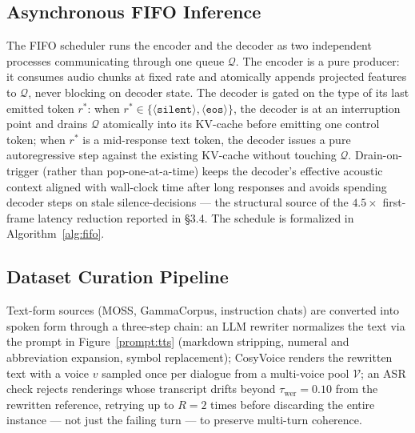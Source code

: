 \documentclass{llmxive}
\begin{document}
\subsection{Asynchronous FIFO Inference}
\label{appendix:fifo-inference}

The FIFO scheduler runs the encoder and the decoder as two independent
processes communicating through one queue $\mathcal{Q}$. The encoder is
a pure producer: it consumes audio chunks at fixed rate and atomically
appends projected features to $\mathcal{Q}$, never blocking on decoder
state. The decoder is gated on the type of its last emitted token $r^*$:
when $r^*\!\in\!\{\langle\texttt{silent}\rangle,
\langle\texttt{eos}\rangle\}$, the decoder is at an interruption point
and drains $\mathcal{Q}$ atomically into its KV-cache before emitting
one control token; when $r^*$ is a mid-response text token, the decoder
issues a pure autoregressive step against the existing KV-cache without
touching $\mathcal{Q}$. Drain-on-trigger (rather than pop-one-at-a-time)
keeps the decoder's effective acoustic context aligned with wall-clock
time after long responses and avoids spending decoder steps on stale
silence-decisions --- the structural source of the $4.5\times$
first-frame latency reduction reported in \S3.4. The schedule is
formalized in Algorithm~\ref{alg:fifo}.

\subsection{Dataset Curation Pipeline}
\label{appendix:curation}

Text-form sources (MOSS, GammaCorpus, instruction chats) are converted
into spoken form through a three-step chain: an LLM rewriter normalizes
the text via the prompt in Figure~\ref{prompt:tts} (markdown stripping,
numeral and abbreviation expansion, symbol replacement); CosyVoice
renders the rewritten text with a voice $v$ sampled once per dialogue
from a multi-voice pool $\mathcal{V}$; an ASR check rejects renderings
whose transcript drifts beyond
$\tau_{\text{wer}}=0.10$ from the rewritten reference, retrying up to
$R=2$ times before discarding the entire instance --- not just the
failing turn --- to preserve multi-turn coherence.
\end{document}
